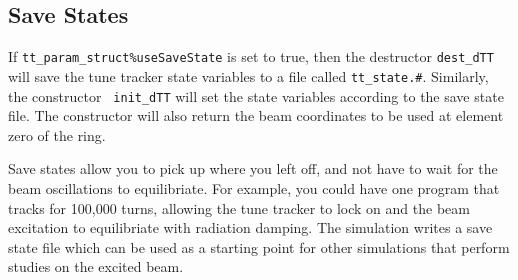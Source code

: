 \subsection{Save States}

If {\tt tt\_param\_struct\%useSaveState} is set to true, then the
destructor {\tt dest\_dTT} will save the tune tracker state variables
to a file called {\tt tt\_state.\#}.  Similarly, the constructor {\tt
init\_dTT} will set the state variables according to the save state
file.  The constructor will also return the beam coordinates to be
used at element zero of the ring.

Save states allow you to pick up where you left off, and not have to
wait for the beam oscillations to equilibriate.  For example, you
could have one program that tracks for 100,000 turns, allowing the
tune tracker to lock on and the beam excitation to equilibriate with
radiation damping.  The simulation writes a save state file which can
be used as a starting point for other simulations that perform studies
on the excited beam.












